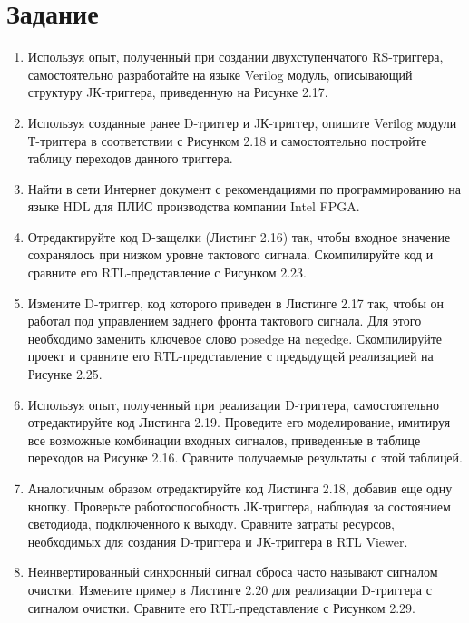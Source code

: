 \documentclass[a4paper,14pt]{article}
\begin{document}

\tableofcontents
\pagebreak
\section{Задание}

\begin{enumerate}
	\item Используя опыт, полученный при создании двухступенчатого RS-триггера, самостоятельно
	разработайте на языке Verilog модуль, описывающий структуру JК-триггера, приведенную на
	Рисунке 2.17.
	
	
	\item Используя созданные ранее D-триrгер и JК-триггер, опишите Verilog модули Т-триггера в
	соответствии с Рисунком 2.18 и самостоятельно постройте таблицу переходов данного
	триггера.
	
	\item Найти в сети Интернет документ с рекомендациями по программированию на языке HDL для
	ПЛИС производства компании Intel FPGA.
	
	\item Отредактируйте код D-защелки (Листинг 2.16) так, чтобы входное значение сохранялось при
	низком уровне тактового сигнала.
	Скомпилируйте код и сравните его RТL-представление с Рисунком 2.23.
	
	\item Измените D-триггер, код которого приведен в Листинге 2.17 так, чтобы он работал под
	управлением заднего фронта тактового сигнала. 
	Для этого необходимо заменить ключевое слово posedge на negedge. 
	Скомпилируйте проект и сравните его RТL-представление с	предыдущей реализацией на Рисунке 2.25.
	
	\item Используя опыт, полученный при реализации D-триггера, самостоятельно отредактируйте
	код Листинга 2.19. 
	Проведите его моделирование, имитируя все возможные комбинации входных сигналов, приведенные в таблице переходов на Рисунке 2.16.
	Сравните получаемые	результаты с этой таблицей.
	
	\item Аналогичным образом отредактируйте код Листинга 2.18, добавив еще одну кнопку.
	Проверьте работоспособность JК-триггера, наблюдая за состоянием светодиода,	подключенного к выходу. 
	Сравните затраты ресурсов, необходимых для создания D-триггера и JК-триггера в RТL Viewer.
	
	\item Неинвертированный синхронный сигнал сброса часто называют сигналом очистки.
	Измените пример в Листинге 2.20 для реализации D-триггера с сигналом очистки.
	Сравните его RТL-представление с Рисунком 2.29.
	

\end{enumerate}
\end{document}
